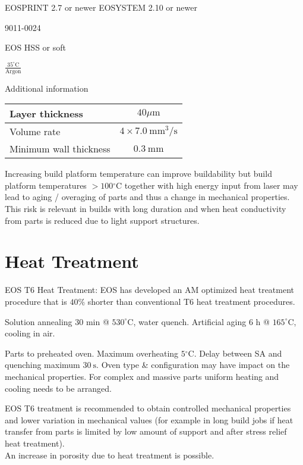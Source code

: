 \documentclass[10pt]{article}
\begin{document}
EOSPRINT 2.7 or newer EOSYSTEM 2.10 or newer

9011-0024

EOS HSS or soft

$\frac{35^{\circ} \mathrm{C}}{\operatorname{Argon}}$

Additional information

\begin{center}
\begin{tabular}{lc}
\hline
Layer thickness & $40 \mu \mathrm{m}$ \\
\hline
Volume rate & $4 \times 7.0 \mathrm{~mm}^{3} / \mathrm{s}$ \\
\hline
Minimum wall thickness & $0.3 \mathrm{~mm}$ \\
\hline
\end{tabular}
\end{center}

Increasing build platform temperature can improve buildability but build platform temperatures $>100{ }^{\circ} \mathrm{C}$ together with high energy input from laser may lead to aging / overaging of parts and thus a change in mechanical properties. This risk is relevant in builds with long duration and when heat conductivity from parts is reduced due to light support structures.

\section*{Heat Treatment}
EOS T6 Heat Treatment: EOS has developed an AM optimized heat treatment procedure that is $40 \%$ shorter than conventional T6 heat treatment procedures.

Solution annealing 30 min @ $530^{\circ} \mathrm{C}$, water quench. Artificial aging 6 h @ $165^{\circ} \mathrm{C}$, cooling in air.

Parts to preheated oven. Maximum overheating $5{ }^{\circ} \mathrm{C}$. Delay between SA and quenching maximum $30 \mathrm{~s}$. Oven type \& configuration may have impact on the mechanical properties. For complex and massive parts uniform heating and cooling needs to be arranged.

EOS T6 treatment is recommended to obtain controlled mechanical properties and lower variation in mechanical values (for example in long build jobs if heat transfer from parts is limited by low amount of support and after stress relief heat treatment).\\
An increase in porosity due to heat treatment is possible.
\end{document}

